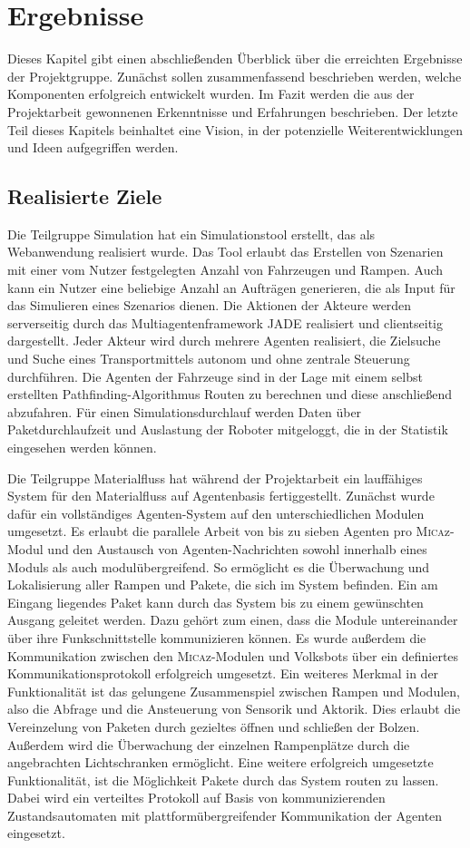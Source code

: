 \section{Ergebnisse}
Dieses Kapitel gibt einen abschließenden Überblick über die erreichten Ergebnisse der Projektgruppe. Zunächst sollen zusammenfassend beschrieben werden, welche Komponenten erfolgreich entwickelt wurden. Im Fazit werden die aus der Projektarbeit gewonnenen Erkenntnisse und Erfahrungen beschrieben. Der letzte Teil dieses Kapitels beinhaltet eine Vision, in der potenzielle Weiterentwicklungen und Ideen aufgegriffen werden. 

\subsection{Realisierte Ziele}

Die Teilgruppe Simulation hat ein Simulationstool erstellt, das als Webanwendung realisiert wurde. Das Tool erlaubt das Erstellen von Szenarien mit einer vom Nutzer festgelegten Anzahl von Fahrzeugen und Rampen. Auch kann ein Nutzer eine beliebige Anzahl an Aufträgen generieren, die als Input für das Simulieren eines Szenarios dienen. Die Aktionen der Akteure werden serverseitig durch das Multiagentenframework JADE realisiert und clientseitig dargestellt. Jeder Akteur wird durch mehrere Agenten realisiert, die Zielsuche und Suche eines Transportmittels autonom und ohne zentrale Steuerung durchführen. Die Agenten der Fahrzeuge sind in der Lage mit einem selbst erstellten Pathfinding-Algorithmus Routen zu berechnen und diese anschließend abzufahren. Für einen Simulationsdurchlauf werden Daten über Paketdurchlaufzeit und Auslastung der Roboter mitgeloggt, die in der Statistik eingesehen werden können.

Die Teilgruppe Materialfluss hat während der Projektarbeit ein lauffähiges System für den Materialfluss auf Agentenbasis fertiggestellt. Zunächst wurde dafür ein vollständiges Agenten-System auf den unterschiedlichen Modulen umgesetzt. Es erlaubt die parallele Arbeit von bis zu sieben Agenten pro \textsc{Mica}z-Modul und den Austausch von Agenten-Nachrichten sowohl innerhalb eines Moduls als auch modulübergreifend. So ermöglicht es die Überwachung und Lokalisierung aller Rampen und Pakete, die sich im System befinden. Ein am Eingang liegendes Paket kann durch das System bis zu einem gewünschten Ausgang geleitet werden. Dazu gehört zum einen, dass die Module untereinander über ihre Funkschnittstelle kommunizieren können. Es wurde außerdem die Kommunikation zwischen den \textsc{Mica}z-Modulen und Volksbots über ein definiertes Kommunikationsprotokoll erfolgreich umgesetzt. Ein weiteres Merkmal in der Funktionalität ist das gelungene Zusammenspiel zwischen Rampen und Modulen, also die Abfrage und die Ansteuerung von Sensorik und Aktorik. Dies erlaubt die Vereinzelung von Paketen durch gezieltes öffnen und schließen der Bolzen. Außerdem wird die Überwachung der einzelnen Rampenplätze durch die angebrachten Lichtschranken ermöglicht. Eine weitere erfolgreich umgesetzte Funktionalität, ist die Möglichkeit Pakete durch das System routen zu lassen. Dabei wird ein verteiltes Protokoll auf Basis von kommunizierenden Zustandsautomaten mit plattformübergreifender Kommunikation der Agenten eingesetzt.


